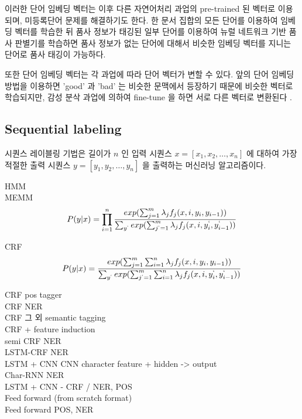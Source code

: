 \documentclass[11pt]{article}
\begin{document}
이러한 단어 임베딩 벡터는 이후 다른 자연어처리 과업의 pre-trained 된 벡터로 이용되며, 미등록단어 문제를 해결하기도 한다.
한 문서 집합의 모든 단어를 이용하여 임베딩 벡터를 학습한 뒤 품사 정보가 태깅된 일부 단어를 이용하여 뉴럴 네트워크 기반 품사 판별기를 학습하면 품사 정보가 없는 단어에 대해서 비슷한 임베딩 벡터를 지니는 단어로 품사 태깅이 가능하다.

또한 단어 임베딩 벡터는 각 과업에 따라 단어 벡터가 변할 수 있다.
앞의 단어 임베딩 방법을 이용하면 'good' 과 'bad' 는 비슷한 문맥에서 등장하기 때문에 비슷한 벡터로 학습되지만, 감성 분삭 과업에 의하여 fine-tune 을 하면 서로 다른 벡터로 변환된다 \citep{kim2014convolutional, joulin2016bag}.

\subsection{Sequential labeling}

시퀀스 레이블링 기법은 길이가 $n$ 인 입력 시퀀스 $x = [x_1, x_2, \dots, x_n]$ 에 대하여 가장 적절한 출력 시퀀스 $y = [y_1, y_2, \dots, y_n]$ 을 출력하는 머신러닝 알고리즘이다.

HMM \citep{krogh1994hidden} \\
MEMM \citep{mccallum2000maximum} \\

\begin{equation}
  \label{eq:memm}
  P(y \vert x) = \prod_{i=1}^{n} \frac{exp(\sum_{j=1}^{m} \lambda_j f_j (x, i, y_i, y_{i-1}))}{ \sum_{y^{`}} exp(\sum_{j^{`}=1}^{m} \lambda_j f_j (x, i, y_i^{`}, y_{i-1}^{`})) }
\end{equation}


CRF \citep{lafferty2001conditional} \\

\begin{equation}
  \label{eq:crf}
  P(y \vert x) = \frac{exp(\sum_{j=1}^{m} \sum_{i=1}^{n} \lambda_j f_j (x, i, y_i, y_{i-1}))}{ \sum_{y^{`}} exp(\sum_{j^{`}=1}^{m} \sum_{i=1}^{n} \lambda_j f_j (x, i, y_i^{`}, y_{i-1}^{`})) }
\end{equation}

CRF pos tagger \citep{toutanova2003feature} \\
CRF NER \citep{sang2003introduction} \\
CRF 그 외 semantic tagging \citep{choi2005identifying} \\
CRF + feature induction \citep{mccallum2003early} \\
semi CRF NER \citep{sarawagi2005semi} \\
LSTM-CRF NER \citep{lample2016neural} \\
LSTM + CNN CNN character feature + hidden -> output \citep{chiu2016named} \\
Char-RNN NER \citep{gridach2017character} \\
LSTM + CNN - CRF / NER, POS \citep{ma2016end} \\
Feed forward (from scratch format) \citep{zheng2013deep} \\
Feed forward POS, NER \citep{collobert2011natural} \\
\end{document}
